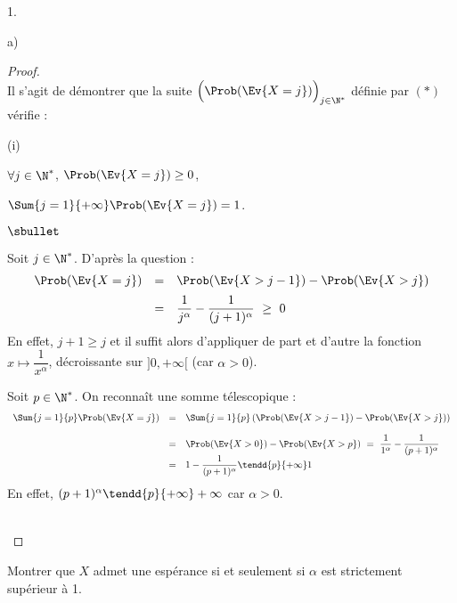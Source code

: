 \documentclass[11pt]{article}%
\begin{document}
\begin{noliste}{1.}
\begin{noliste}{a)}
    \begin{proof}~\\%
      Il s'agit de démontrer que la suite $\Big( \Prob(\Ev{X = j})
      \Big)_{j \in \N^*}$ définie par $(\ast)$ vérifie :
      \begin{noliste}{(i)}
      \item $\forall j \in \N^*$, $\Prob(\Ev{X = j}) \geq 0$,
      \item $\Sum{j = 1}{+\infty} \Prob(\Ev{X = j}) = 1$.
      \end{noliste}
      \begin{noliste}{$\sbullet$}
      \item Soit $j \in \N^*$. D'après la question  :
        \[
        \begin{array}{rcl}
          \Prob(\Ev{X = j}) & = & \Prob(\Ev{X > j-1}) - \Prob(\Ev{X >
            j})
          \\[.2cm]
          & = & \dfrac{1}{j^{\alpha}} - \dfrac{1}{(j+1)^{\alpha}} \
          \geq \ 0
        \end{array}
        \]
        En effet, $j + 1 \geq j$ et il suffit alors d'appliquer de
        part et d'autre la fonction $x \mapsto \dfrac{1}{x^\alpha}$,
        décroissante sur $]0, +\infty[$ (car $\alpha > 0$).


        \newpage


      \item Soit $p \in \N^*$. On reconnaît une somme télescopique :
        \[
        \begin{array}{rcl}
          \Sum{j=1}{p} \Prob(\Ev{X = j}) & = & \Sum{j=1}{p}
          \left(\Prob(\Ev{X > j-1}) - \Prob(\Ev{X > j}) \right) 
          \\[.4cm]
          & = & \Prob(\Ev{X > 0}) - \Prob(\Ev{X > p}) \ = \
          \dfrac{1}{1^\alpha} - \dfrac{1}{(p+1)^\alpha} 
          \\[.2cm]
          & = & 1 - \dfrac{1}{(p+1)^\alpha} \tendd{p}{+\infty} 1
        \end{array}
        \]
        En effet, $(p+1)^\alpha \tendd{p}{+\infty} +\infty$ car
        $\alpha > 0$.
      \end{noliste}
      ~\\[-.8cm]
    \end{proof}




  \item Montrer que $X$ admet une espérance si et seulement si $\alpha$ 
    est strictement supérieur à 1.


\end{noliste}
\end{noliste}
\end{document}
